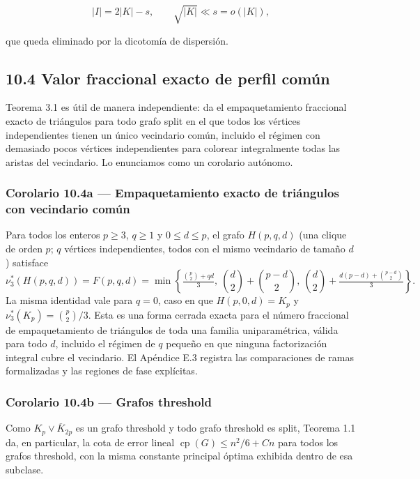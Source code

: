 \documentclass[spanish,11pt,a4paper]{article}
\begin{document}
\[
|I|=2|K|-s,
\qquad
\sqrt{|K|}\ll s=o(|K|),
\]

que queda eliminado por la dicotomía de dispersión.

\subsection{10.4 Valor fraccional exacto de perfil
común}\label{valor-fraccional-exacto-de-perfil-comuxfan}

Teorema 3.1 es útil de manera independiente: da el empaquetamiento
fraccional exacto de triángulos para todo grafo split en el que todos
los vértices independientes tienen un único vecindario común, incluido
el régimen con demasiado pocos vértices independientes para colorear
integralmente todas las aristas del vecindario. Lo enunciamos como un
corolario autónomo.

\subsubsection{Corolario 10.4a --- Empaquetamiento exacto de triángulos
con vecindario
común}\label{corolario-10.4a-empaquetamiento-exacto-de-triuxe1ngulos-con-vecindario-comuxfan}

Para todos los enteros \(p\ge3\), \(q\ge1\) y \(0\le d\le p\), el grafo
\(H(p,q,d)\) (una clique de orden \(p\); \(q\) vértices independientes,
todos con el mismo vecindario de tamaño \(d\)) satisface \[
\nu_3^*(H(p,q,d))=F(p,q,d)=\min\left\{\tfrac{\binom p2+qd}{3},\ \binom d2+\binom{p-d}2,\ \binom d2+\tfrac{d(p-d)+\binom{p-d}2}{3}\right\}.
\] La misma identidad vale para \(q=0\), caso en que \(H(p,0,d)=K_p\) y
\(\nu_3^*(K_p)=\binom p2/3\). Esta es una forma cerrada exacta para el
número fraccional de empaquetamiento de triángulos de toda una familia
uniparamétrica, válida para todo \(d\), incluido el régimen de \(q\)
pequeño en que ninguna factorización integral cubre el vecindario. El
Apéndice E.3 registra las comparaciones de ramas formalizadas y las
regiones de fase explícitas.

\subsubsection{Corolario 10.4b --- Grafos
threshold}\label{corolario-10.4b-grafos-threshold}

Como \(K_p\vee\overline K_{2p}\) es un grafo threshold y todo grafo
threshold es split, Teorema 1.1 da, en particular, la cota de error
lineal \(\operatorname{cp}(G)\le n^2/6+Cn\) para todos los grafos
threshold, con la misma constante principal óptima exhibida dentro de
esa subclase.
\end{document}
